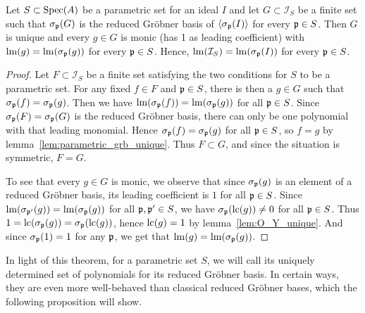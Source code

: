\begin{theorem}\label{thm:red_grb_uniq_and_monic_and_stable}
  Let $S \subset \operatorname{Spec}(A)$ be a parametric set for an ideal $I$ and let $G \subset \mathcal I_{S}$ be a finite set such that $\sigma_{\mathfrak p}(G)$ is the reduced Gröbner basis of $\langle \sigma_{\mathfrak p}(I) \rangle$ for every $\mathfrak p \in S$. Then $G$ is unique and every $g \in G$ is monic (has 1 as leading coefficient) with $\operatorname{lm}(g) = \operatorname{lm}(\sigma_{\mathfrak p}(g))$ for every $\mathfrak p \in S$. Hence, $\operatorname{lm}(\mathcal I_{S}) = \operatorname{lm}(\sigma_{\mathfrak p}(I))$ for every $\mathfrak p \in S$.
\end{theorem}
\begin{proof}
  Let $F \subset \mathcal I_{S}$ be a finite set satisfying the two conditions for $S$ to be a parametric set. For any fixed $f \in F$ and $\mathfrak p \in S$, there is then a $g \in G$ such that $\sigma_{\mathfrak p}(f) = \sigma_{\mathfrak p}(g)$. Then we have $\operatorname{lm}(\sigma_{\mathfrak p}(f)) = \operatorname{lm}(\sigma_{\mathfrak p}(g))$ for all $\mathfrak p \in S$. Since $\sigma_{\mathfrak p}(F) = \sigma_{\mathfrak p}(G)$ is the reduced Gröbner basis, there can only be one polynomial with that leading monomial. Hence $\sigma_{\mathfrak p}(f) = \sigma_{\mathfrak p}(g)$ for all $\mathfrak p \in S$, so $f = g$ by lemma~\ref{lem:parametric_grb_unique}. Thus $F \subset G$, and since the situation is symmetric, $F = G$.

  To see that every $g \in G$ is monic, we observe that since $\sigma_{\mathfrak p}(g)$ is an element of a reduced Gröbner basis, its leading coefficient is $1$ for all $\mathfrak p \in S$. Since $\operatorname{lm}(\sigma_{\mathfrak p'}(g)) = \operatorname{lm}(\sigma_{\mathfrak p}(g))$ for all $\mathfrak p, \mathfrak p' \in S$, we have $\sigma_{\mathfrak p}(\operatorname{lc}(g)) \neq 0$ for all $\mathfrak p \in S$. Thus $1 = \operatorname{lc}(\sigma_{\mathfrak p}(g)) = \sigma_{\mathfrak p}(\operatorname{lc}(g))$, hence $\operatorname{lc}(g) = 1$ by lemma~\ref{lem:O_Y_unique}. And since $\sigma_{\mathfrak p}(1) = 1$ for any $\mathfrak p$, we get that $\operatorname{lm}(g) = \operatorname{lm}(\sigma_{\mathfrak p}(g))$.
\end{proof}

In light of this theorem, for a parametric set $S$, we will call its uniquely determined set of polynomials for its reduced Gröbner basis. In certain ways, they are even more well-behaved than classical reduced Gröbner bases, which the following proposition will show.

